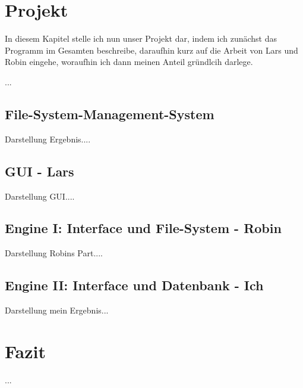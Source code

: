 \documentclass[12pt,a4paper,bibliography=totocnumbered,listof=totocnumbered]{scrartcl}
\begin{document}
\section{Projekt}
In diesem Kapitel stelle ich nun unser Projekt dar, indem ich zunächst das Programm im Gesamten beschreibe, daraufhin kurz auf die Arbeit von Lars und Robin eingehe, woraufhin ich dann meinen Anteil gründlcih darlege.


...

\subsection{File-System-Management-System}
Darstellung Ergebnis....

\subsection{GUI - Lars}
Darstellung GUI....

\subsection{Engine I: Interface und File-System - Robin}
Darstellung Robins Part....

\subsection{Engine II: Interface und Datenbank - Ich}
Darstellung mein Ergebnis...
\pagebreak
\section{Fazit}
...
\pagebreak

\end{document}
